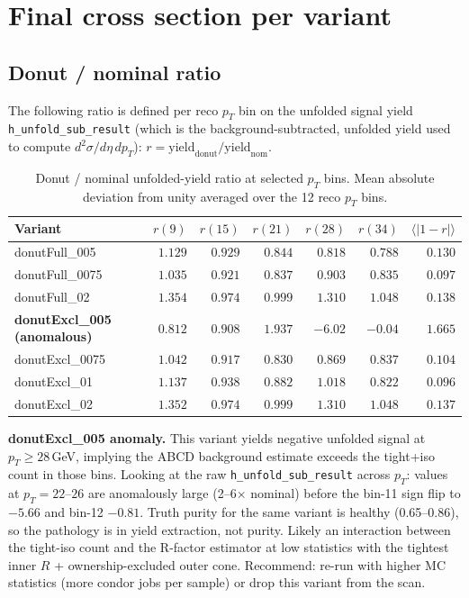 \documentclass[11pt,a4paper]{article}
\begin{document}
\section*{Final cross section per variant}

\subsection*{Donut / nominal ratio}

The following ratio is defined per reco $p_T$ bin on the unfolded signal yield
\texttt{h\_unfold\_sub\_result} (which is the background-subtracted, unfolded
yield used to compute $d^2\sigma/d\eta\, dp_T$): $r = \mathrm{yield}_\mathrm{donut} /
\mathrm{yield}_\mathrm{nom}$.

\begin{table}[H]
\centering
\caption{Donut / nominal unfolded-yield ratio at selected $p_T$ bins.
Mean absolute deviation from unity averaged over the 12 reco $p_T$ bins.}
\begin{tabular}{lrrrrrr}
\toprule
Variant & $r(9)$ & $r(15)$ & $r(21)$ & $r(28)$ & $r(34)$ & $\langle|1-r|\rangle$ \\
\midrule
donutFull\_005  & $1.129$ & $0.929$ & $0.844$ & $0.818$  & $0.788$  & $0.130$ \\
donutFull\_0075 & $1.035$ & $0.921$ & $0.837$ & $0.903$  & $0.835$  & $0.097$ \\
donutFull\_02   & $1.354$ & $0.974$ & $0.999$ & $1.310$  & $1.048$  & $0.138$ \\
\textbf{donutExcl\_005 (anomalous)} & $0.812$ & $0.908$ & $1.937$ & $\mathbf{-6.02}$ & $\mathbf{-0.04}$ & $1.665$ \\
donutExcl\_0075 & $1.042$ & $0.917$ & $0.830$ & $0.869$  & $0.837$  & $0.104$ \\
donutExcl\_01   & $1.137$ & $0.938$ & $0.882$ & $1.018$  & $0.822$  & $0.096$ \\
donutExcl\_02   & $1.352$ & $0.974$ & $0.999$ & $1.310$  & $1.048$  & $0.137$ \\
\bottomrule
\end{tabular}
\end{table}

\textbf{donutExcl\_005 anomaly.} This variant yields negative unfolded
signal at $p_T \ge 28$\,GeV, implying the ABCD background estimate exceeds
the tight+iso count in those bins. Looking at the raw
\texttt{h\_unfold\_sub\_result} across $p_T$: values at $p_T = 22$--$26$
are anomalously large (2--6$\times$ nominal) before the bin-11 sign flip to $-5.66$
and bin-12 $-0.81$. Truth purity for the same variant is healthy (0.65--0.86),
so the pathology is in yield extraction, not purity. Likely an interaction
between the tight-iso count and the R-factor estimator at low statistics
with the tightest inner $R$ + ownership-excluded outer cone. Recommend:
re-run with higher MC statistics (more condor jobs per sample) or drop this
variant from the scan.
\end{document}
